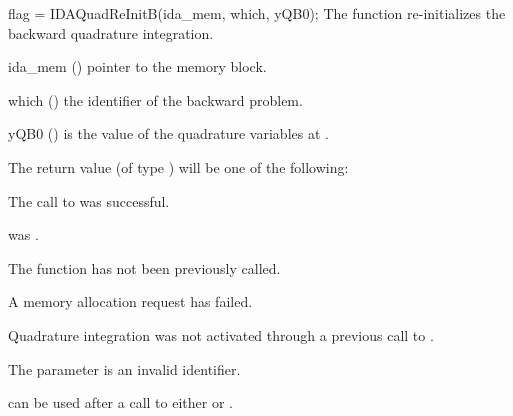 {
  flag = IDAQuadReInitB(ida\_mem, which, yQB0);
}
{
  The function  re-initializes the backward quadrature integration.
}
{
  \begin{args}
  \item[ida\_mem] ()
    pointer to the {\idas} memory block.
  \item[which] ()
    the identifier of the backward problem.
  \item[yQB0] ()
    is the value of the quadrature variables at .
  \end{args}
}
{
  The return value  (of type ) will be one of the following:
  \begin{args}
  \item[\Id{IDA\_SUCCESS}]
    The call to  was successful.
 \item[\Id{IDA\_MEM\_NULL}] 
     was .
  \item[\Id{IDA\_NO\_ADJ}]
    The function  has not been previously called.
  \item[\Id{IDA\_MEM\_FAIL}] 
    A memory allocation request has failed.
  \item[\Id{IDA\_NO\_QUAD}] 
    Quadrature integration was not activated through a  previous 
    call to .
  \item[\Id{IDA\_ILL\_INPUT}]
    The parameter  is an invalid identifier.
  \end{args}
}
{
   can be used after a call to either 
  or .
}

